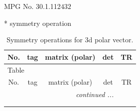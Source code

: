 \documentclass[fleqn,8pt]{jsarticle}
\begin{document}
\setcounter{MaxMatrixCols}{32}

\renewcommand{\tablename}{Table~}
\renewcommand{\figurename}{Figure~}
\begin{center}
\LARGE
MPG No. 30.1.112\quad$432$
\end{center}
* symmetry operation
\renewcommand{\arraystretch}{1.3}
\begin{longtable}{ccccc}
\caption{Symmetry operations for 3d polar vector.}
 \\
 \hline \hline
No. & tag & matrix (polar) & det & TR \\ \hline \endfirsthead

\multicolumn{4}{l}{\tablename\ \thetable{}} \\
 \hline \hline
No. & tag & matrix (polar) & det & TR \\ \hline \endhead

 \hline \hline
\multicolumn{4}{r}{\footnotesize\it continued ...} \\ \endfoot

 \hline \hline
\multicolumn{4}{r}{} \\ \endlastfoot


\end{longtable}
\end{document}
